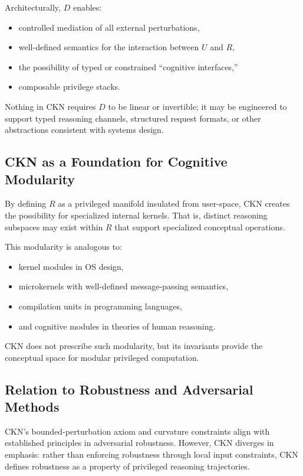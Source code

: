 \documentclass[11pt,a4paper]{article}
\begin{document}
Architecturally, $D$ enables:
\begin{itemize}
    \item controlled mediation of all external perturbations,
    \item well-defined semantics for the interaction between $U$ and $R$,
    \item the possibility of typed or constrained ``cognitive interfaces,''
    \item composable privilege stacks.
\end{itemize}

Nothing in CKN requires $D$ to be linear or invertible; it may be engineered to support typed reasoning channels, structured request formats, or other abstractions consistent with systems design.

\subsection{CKN as a Foundation for Cognitive Modularity}

By defining $R$ as a privileged manifold insulated from user-space, CKN creates the possibility for specialized internal kernels. That is, distinct reasoning subspaces may exist within $R$ that support specialized conceptual operations.

This modularity is analogous to:
\begin{itemize}
    \item kernel modules in OS design,
    \item microkernels with well-defined message-passing semantics,
    \item compilation units in programming languages,
    \item and cognitive modules in theories of human reasoning.
\end{itemize}

CKN does not prescribe such modularity, but its invariants provide the conceptual space for modular privileged computation.

\subsection{Relation to Robustness and Adversarial Methods}

CKN's bounded-perturbation axiom and curvature constraints align with established principles in adversarial robustness. However, CKN diverges in emphasis: rather than enforcing robustness through local input constraints, CKN defines robustness as a property of privileged reasoning trajectories.
\end{document}
